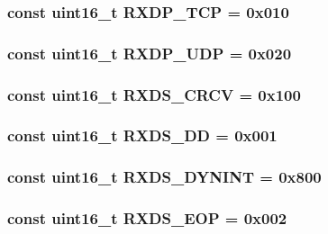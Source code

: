 \label{namespaceiGbReg_a28e7a3b67c3706e10dbd04b178b8524c}
\hypertarget{namespaceiGbReg_a3194c61cd3bbfba3e0c2002e3bc370f5}{
\subsubsection[{RXDP\_\-TCP}]{\setlength{\rightskip}{0pt plus 5cm}const uint16\_\-t {\bf RXDP\_\-TCP} = 0x010}}
\label{namespaceiGbReg_a3194c61cd3bbfba3e0c2002e3bc370f5}
\hypertarget{namespaceiGbReg_a8bb50a93437adde2602f7501247099d0}{
\subsubsection[{RXDP\_\-UDP}]{\setlength{\rightskip}{0pt plus 5cm}const uint16\_\-t {\bf RXDP\_\-UDP} = 0x020}}
\label{namespaceiGbReg_a8bb50a93437adde2602f7501247099d0}
\hypertarget{namespaceiGbReg_a2fac9a66d8928f307a3e062231131524}{
\subsubsection[{RXDS\_\-CRCV}]{\setlength{\rightskip}{0pt plus 5cm}const uint16\_\-t {\bf RXDS\_\-CRCV} = 0x100}}
\label{namespaceiGbReg_a2fac9a66d8928f307a3e062231131524}
\hypertarget{namespaceiGbReg_ad96ccac73daaa7c0f55a9f2ef4c3d1fd}{
\subsubsection[{RXDS\_\-DD}]{\setlength{\rightskip}{0pt plus 5cm}const uint16\_\-t {\bf RXDS\_\-DD} = 0x001}}
\label{namespaceiGbReg_ad96ccac73daaa7c0f55a9f2ef4c3d1fd}
\hypertarget{namespaceiGbReg_adc8a4e89db2d1c46c873fdf515ed99dc}{
\subsubsection[{RXDS\_\-DYNINT}]{\setlength{\rightskip}{0pt plus 5cm}const uint16\_\-t {\bf RXDS\_\-DYNINT} = 0x800}}
\label{namespaceiGbReg_adc8a4e89db2d1c46c873fdf515ed99dc}
\hypertarget{namespaceiGbReg_a4bf1dbf21e11b2b4709870ea28923795}{
\subsubsection[{RXDS\_\-EOP}]{\setlength{\rightskip}{0pt plus 5cm}const uint16\_\-t {\bf RXDS\_\-EOP} = 0x002}}
